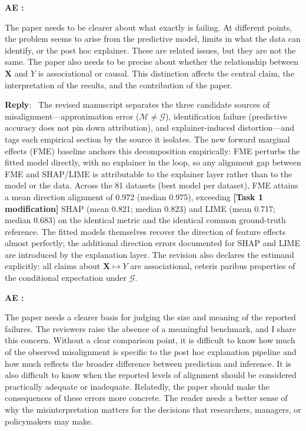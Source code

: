 \documentclass[11pt]{article}
\newcounter{se}[section]
\newcounter{aed}[section]
\newenvironment{aed}[1][]{%
    \refstepcounter{aed}\par\medskip\noindent%
    \textbf{AE \theaed: #1}\rmfamily\itshape%
}{\medskip}
\newcounter{reviewer}
\newcounter{point}[reviewer]
\newenvironment{reply}
 {\par\medskip \noindent \begin{sf}\textbf{Reply}:\ }
 {\medskip \end{sf}}
\begin{document}
\begin{aed}
The paper needs to be clearer about what exactly is failing. At different points, the problem seems to arise from the predictive model, limits in what the data can identify, or the post hoc explainer. These are related issues, but they are not the same. The paper also needs to be precise about whether the relationship between $\mathbf{X}$ and $Y$ is associational or causal. This distinction affects the central claim, the interpretation of the results, and the contribution of the paper.
\end{aed}

\begin{reply}
{\color{red}
The revised manuscript separates the three candidate sources of misalignment---approximation error ($\mathcal{M}\neq\mathcal{G}$), identification failure (predictive accuracy does not pin down attribution), and explainer-induced distortion---and tags each empirical section by the source it isolates. The new forward marginal effects (FME) baseline anchors this decomposition empirically: FME perturbs the fitted model directly, with no explainer in the loop, so any alignment gap between FME and SHAP/LIME is attributable to the explainer layer rather than to the model or the data. Across the 81 datasets (best model per dataset), FME attains a mean direction alignment of 0.972 (median 0.975), exceeding {\color{blue}\textbf{[Task 1 modification]} SHAP (mean 0.821; median 0.823) and LIME (mean 0.717; median 0.683)} on the identical metric and the identical common ground-truth reference. The fitted models themselves recover the direction of feature effects almost perfectly; the additional direction errors documented for SHAP and LIME are introduced by the explanation layer. The revision also declares the estimand explicitly: all claims about $\mathbf{X} \mapsto Y$ are associational, ceteris paribus properties of the conditional expectation under $\mathcal{G}$.
}
\end{reply}


\begin{aed}
The paper needs a clearer basis for judging the size and meaning of the reported failures. The reviewers raise the absence of a meaningful benchmark, and I share this concern. Without a clear comparison point, it is difficult to know how much of the observed misalignment is specific to the post hoc explanation pipeline and how much reflects the broader difference between prediction and inference. It is also difficult to know when the reported levels of alignment should be considered practically adequate or inadequate. Relatedly, the paper should make the consequences of these errors more concrete. The reader needs a better sense of why the misinterpretation matters for the decisions that researchers, managers, or policymakers may make.
\end{aed}
\end{document}
